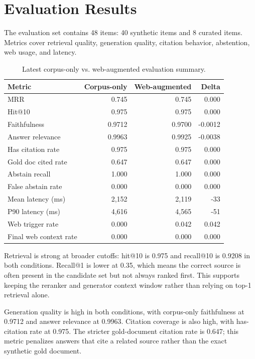 \documentclass[11pt]{article}
\begin{document}
\section{Evaluation Results}

The evaluation set contains 48 items: 40 synthetic items and 8 curated items. Metrics cover
retrieval quality, generation quality, citation behavior, abstention, web usage, and
latency.

\begin{table}[h]
\centering
\small
\begin{tabular}{lrrr}
\toprule
Metric & Corpus-only & Web-augmented & Delta \\
\midrule
MRR & 0.745 & 0.745 & 0.000 \\
Hit@10 & 0.975 & 0.975 & 0.000 \\
Faithfulness & 0.9712 & 0.9700 & -0.0012 \\
Answer relevance & 0.9963 & 0.9925 & -0.0038 \\
Has citation rate & 0.975 & 0.975 & 0.000 \\
Gold doc cited rate & 0.647 & 0.647 & 0.000 \\
Abstain recall & 1.000 & 1.000 & 0.000 \\
False abstain rate & 0.000 & 0.000 & 0.000 \\
Mean latency (ms) & 2,152 & 2,119 & -33 \\
P90 latency (ms) & 4,616 & 4,565 & -51 \\
Web trigger rate & 0.000 & 0.042 & 0.042 \\
Final web context rate & 0.000 & 0.000 & 0.000 \\
\bottomrule
\end{tabular}
\caption{Latest corpus-only vs. web-augmented evaluation summary.}
\end{table}

Retrieval is strong at broader cutoffs: hit@10 is 0.975 and recall@10 is 0.9208 in both
conditions. Recall@1 is lower at 0.35, which means the correct source is often present in
the candidate set but not always ranked first. This supports keeping the reranker and
generator context window rather than relying on top-1 retrieval alone.

Generation quality is high in both conditions, with corpus-only faithfulness at 0.9712 and
answer relevance at 0.9963. Citation coverage is also high, with has-citation rate at
0.975. The stricter gold-document citation rate is 0.647; this metric penalizes answers
that cite a related source rather than the exact synthetic gold document.
\end{document}
